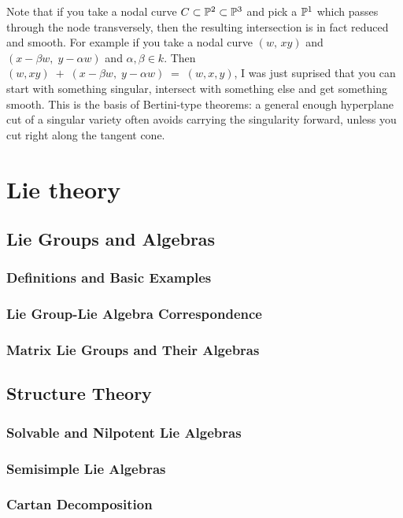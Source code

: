 \documentclass[12pt]{article}
\begin{document}
\begin{remark}
    Note that if you take a nodal curve $C\subset \P^2\subset \P^3$ and pick a $\P^1$ which passes through the node transversely, then the resulting intersection is in fact reduced and smooth. For example if you take a nodal curve $(w,\,xy)$ and $(x-\beta w,\; y-\alpha w)$ and $\alpha,\beta\in k$. Then $(w,xy)\;+\;(x-\beta w,\; y-\alpha w)\;=\;(w,x,y)$, I was just suprised that you can start with something singular, intersect with something else and get something smooth. This is the basis of Bertini-type theorems: a general enough hyperplane cut of a singular variety often avoids carrying the singularity forward, unless you cut right along the tangent cone.
\end{remark}
\section{Lie theory}
\subsection{Lie Groups and Algebras}
\subsubsection{Definitions and Basic Examples}
\subsubsection{Lie Group-Lie Algebra Correspondence}
\subsubsection{Matrix Lie Groups and Their Algebras}

\subsection{Structure Theory}
\subsubsection{Solvable and Nilpotent Lie Algebras}
\subsubsection{Semisimple Lie Algebras}
\subsubsection{Cartan Decomposition}
\end{document}
